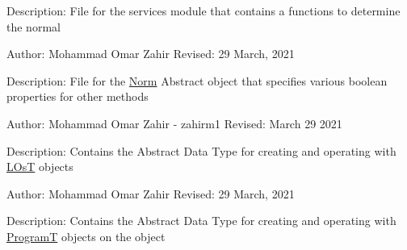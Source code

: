 Description\+: File for the services module that contains a functions to determine the normal

Author\+: Mohammad Omar Zahir Revised\+: 29 March, 2021

Description\+: File for the \hyperlink{classsrc_1_1Norm}{Norm} Abstract object that specifies various boolean properties for other methods

Author\+: Mohammad Omar Zahir -\/ zahirm1 Revised\+: March 29 2021

Description\+: Contains the Abstract Data Type for creating and operating with \hyperlink{classsrc_1_1LOsT}{L\+OsT} objects

Author\+: Mohammad Omar Zahir Revised\+: 29 March, 2021

Description\+: Contains the Abstract Data Type for creating and operating with \hyperlink{classsrc_1_1ProgramT}{ProgramT} objects on the object 